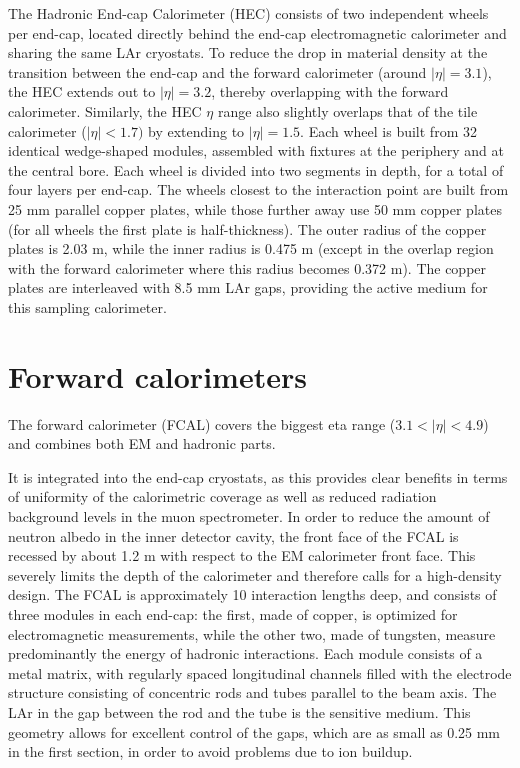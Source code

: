 The Hadronic End-cap Calorimeter (HEC) consists of two
independent wheels per end-cap, located directly behind the end-cap electromagnetic calorimeter
and sharing the same LAr cryostats. To reduce the drop in material density at the transition between
the end-cap and the forward calorimeter (around $|\eta| = 3.1$), the HEC extends out to $|\eta| = 3.2$,
thereby overlapping with the forward calorimeter. Similarly, the HEC $\eta$ range also slightly overlaps
that of the tile calorimeter ($|\eta| < 1.7)$ by extending to $|\eta| = 1.5$. Each wheel is built from 32
identical wedge-shaped modules, assembled with fixtures at the periphery and at the central bore.
Each wheel is divided into two segments in depth, for a total of four layers per end-cap. The wheels
closest to the interaction point are built from 25 mm parallel copper plates, while those further away
use 50 mm copper plates (for all wheels the first plate is half-thickness). The outer radius of the
copper plates is 2.03 m, while the inner radius is 0.475 m (except in the overlap region with the
forward calorimeter where this radius becomes 0.372 m). The copper plates are interleaved with
8.5 mm LAr gaps, providing the active medium for this sampling calorimeter.

\section{Forward calorimeters}
\label{sec:ATLAS_FCAL}

The forward calorimeter (FCAL) covers the biggest eta range ($3.1 < |\eta| < 4.9$) and combines both EM and hadronic parts.

It is integrated into the end-cap cryostats, as this provides
clear benefits in terms of uniformity of the calorimetric coverage as well as
reduced radiation background levels in the muon spectrometer. In order to reduce the amount of
neutron albedo in the inner detector cavity, the front face of the FCAL is recessed by about 1.2 m
with respect to the EM calorimeter front face. This severely limits the depth of the calorimeter
and therefore calls for a high-density design. The FCAL is approximately 10 interaction lengths
deep, and consists of three modules in each end-cap: the first, made of copper, is optimized for
electromagnetic measurements, while the other two, made of tungsten, measure predominantly the
energy of hadronic interactions. Each module consists of a metal matrix, with regularly spaced
longitudinal channels filled with the electrode structure consisting of concentric rods and tubes
parallel to the beam axis. The LAr in the gap between the rod and the tube is the sensitive medium.
This geometry allows for excellent control of the gaps, which are as small as 0.25 mm in the first
section, in order to avoid problems due to ion buildup.

